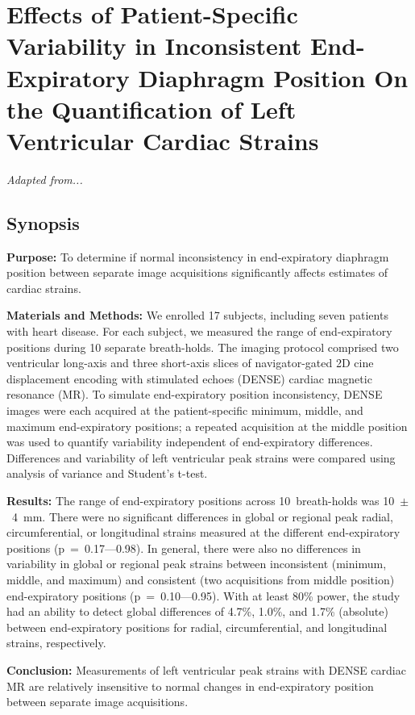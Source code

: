 \chapter{Effects of Patient-Specific Variability in Inconsistent End-Expiratory Diaphragm Position On the Quantification of Left Ventricular Cardiac Strains}

\textit{Adapted from...}

\section{Synopsis}
	\noindent \textbf{Purpose:}  To determine if normal inconsistency in end-expiratory diaphragm position between separate image acquisitions significantly affects estimates of cardiac strains.

	\noindent \textbf{Materials and Methods:} We enrolled 17 subjects, including seven patients with heart disease. For each subject, we measured the range of end-expiratory positions during 10 separate breath-holds. The imaging protocol comprised two ventricular long-axis and three short-axis slices of navigator-gated 2D cine displacement encoding with stimulated echoes (DENSE) cardiac magnetic resonance (MR). To simulate end-expiratory position inconsistency, DENSE images were each acquired at the patient-specific minimum, middle, and maximum end-expiratory positions; a repeated acquisition at the middle position was used to quantify variability independent of end-expiratory differences. Differences and variability of left ventricular peak strains were compared using analysis of variance and Student’s t-test.
	
	\noindent \textbf{Results:} The range of end-expiratory positions across 10~breath-holds was 10~$\pm$~4~mm. There were no significant differences in global or regional peak radial, circumferential, or longitudinal strains measured at the different end-expiratory positions (p~=~0.17–--0.98). In general, there were also no differences in variability in global or regional peak strains between inconsistent (minimum, middle, and maximum) and consistent (two acquisitions from middle position) end-expiratory positions (p~=~0.10--–0.95). With at least 80\% power, the study had an ability to detect global differences of 4.7\%, 1.0\%, and 1.7\% (absolute) between end-expiratory positions for radial, circumferential, and longitudinal strains, respectively.
	
	\noindent \textbf{Conclusion:} Measurements of left ventricular peak strains with DENSE cardiac MR are relatively insensitive to normal changes in end-expiratory position between separate image acquisitions.
	\bigskip
	
